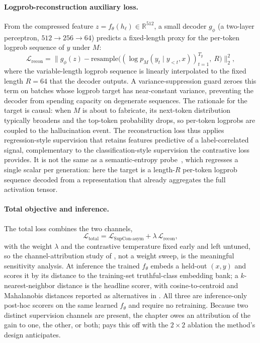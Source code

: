 \paragraph{Logprob-reconstruction auxiliary loss.}
From the compressed feature $z = f_\theta(h_\ell) \in \mathbb{R}^{512}$, a small
decoder $g_\phi$ (a two-layer perceptron, $512 \to 256 \to 64$) predicts a
fixed-length proxy for the per-token logprob sequence of $y$ under $M$:
\begin{equation} \mathcal{L}_{\mathrm{recon}} = \big\| g_\phi(z) - \mathrm{resample}\big( (\log p_M(y_t \mid y_{<t}, x))_{t=1}^{T_y},\ R \big) \big\|_2^2, \label{eq:hd:recon} \end{equation}
where the variable-length logprob sequence is linearly interpolated to the fixed
length $R = 64$ that the decoder outputs. A variance-suppression guard zeroes
this term on batches whose logprob target has near-constant variance, preventing
the decoder from spending capacity on degenerate sequences. The rationale for the
target is causal: when $M$ is about to fabricate, its next-token distribution
typically broadens and the top-token probability drops, so per-token logprobs are
coupled to the hallucination event. The reconstruction loss thus applies
regression-style supervision that retains features predictive of a
label-correlated signal, complementary to the classification-style supervision
the contrastive loss provides. It is not the same as a semantic-entropy
probe~\citep{kossen2024semantic}, which regresses a single scalar per
generation: here the target is a length-$R$ per-token logprob sequence decoded
from a representation that already aggregates the full activation tensor.

\paragraph{Total objective and inference.}
The total loss combines the two channels,
\begin{equation} \mathcal{L}_{\mathrm{total}} = \mathcal{L}_{\mathrm{SupCon\text{-}asym}} + \lambda\, \mathcal{L}_{\mathrm{recon}}, \label{eq:hd:total} \end{equation}
with the weight $\lambda$ and the contrastive temperature fixed early and left
untuned, so the channel-attribution study of , not a
weight sweep, is the meaningful sensitivity analysis. At inference the trained
$f_\theta$ embeds a held-out $(x,y)$ and scores it by its distance to the
training-set truthful-class embedding bank; a $k$-nearest-neighbor distance is
the headline scorer, with cosine-to-centroid and Mahalanobis distances reported
as alternatives in . All three are inference-only post-hoc
scorers on the same learned $f_\theta$ and require no retraining. Because two
distinct supervision channels are present, the chapter owes an attribution of the
gain to one, the other, or both;  pays this off with the
$2 \times 2$ ablation the method's design anticipates.

